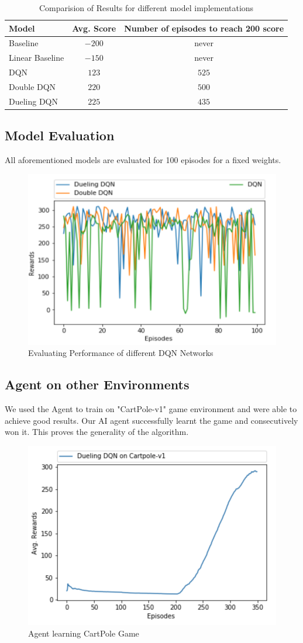 \label{sec:exp}
\begin{table}%
\centering
\begin{tabular}{|l|c|c|}
\hline
Model & Avg. Score  & Number of episodes to reach 200 score  \\
\hline
Baseline & $-200$ & never \\
\hline
Linear Baseline & $-150$ & never \\
\hline
DQN & $123$ & $525$ \\
\hline
Double DQN & $220$ & $500$ \\
\hline
Dueling DQN & $225$ & $435$ \\
\hline
\end{tabular}
\caption{Comparision of Results for different model implementations}
\label{tab:Variants of DQN}
\end{table}


\subsection{ Model Evaluation}

All aforementioned models are evaluated for 100 episodes for a fixed weights. \\  
\begin{figure}[!ht]
\centering
\includegraphics[scale=0.50,width=0.50\columnwidth]{figures/Picture2.png}%
\caption{ Evaluating Performance of different DQN Networks}%
\label{fig:Different DQN Performance}%
\end{figure}

\subsection{ Agent on other Environments}
We used the Agent to train on "CartPole-v1" game environment and were able to achieve good results. Our AI agent successfully learnt the game and consecutively won it. This proves the generality of the algorithm.

\begin{figure}[!ht]
\centering
\includegraphics[scale=0.50,width=0.50\columnwidth]{figures/Cartpolev1.png}%
\caption{ Agent learning CartPole Game}%
\label{fig:Visualization}%
\end{figure}
